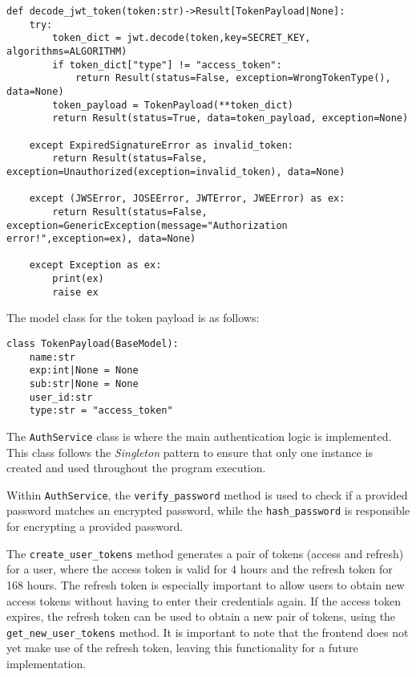 \begin{verbatim}
def decode_jwt_token(token:str)->Result[TokenPayload|None]:
    try:
        token_dict = jwt.decode(token,key=SECRET_KEY, algorithms=ALGORITHM)
        if token_dict["type"] != "access_token":
            return Result(status=False, exception=WrongTokenType(), data=None)
        token_payload = TokenPayload(**token_dict)
        return Result(status=True, data=token_payload, exception=None)
    
    except ExpiredSignatureError as invalid_token:
        return Result(status=False, exception=Unauthorized(exception=invalid_token), data=None)

    except (JWSError, JOSEError, JWTError, JWEError) as ex:
        return Result(status=False, exception=GenericException(message="Authorization error!",exception=ex), data=None)

    except Exception as ex:
        print(ex)
        raise ex
\end{verbatim}

The model class for the token payload is as follows:
\begin{verbatim}
class TokenPayload(BaseModel):
    name:str
    exp:int|None = None
    sub:str|None = None
    user_id:str
    type:str = "access_token"
\end{verbatim}

The \texttt{AuthService} class is where the main authentication logic is implemented. This class follows the \textit{Singleton} pattern to ensure that only one instance is created and used throughout the program execution.

Within \texttt{AuthService}, the \texttt{verify\_password} method is used to check if a provided password matches an encrypted password, while the \texttt{hash\_password} is responsible for encrypting a provided password.

The \texttt{create\_user\_tokens} method generates a pair of tokens (access and refresh) for a user, where the access token is valid for 4 hours and the refresh token for 168 hours. The refresh token is especially important to allow users to obtain new access tokens without having to enter their credentials again. If the access token expires, the refresh token can be used to obtain a new pair of tokens, using the \texttt{get\_new\_user\_tokens} method. It is important to note that the frontend does not yet make use of the refresh token, leaving this functionality for a future implementation.

